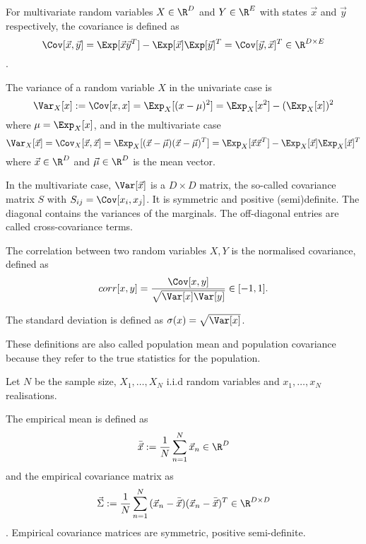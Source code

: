 For multivariate random variables
$X \in \R^D$ and $Y \in \R^E$
with states $\vec{x}$ and $\vec{y}$ respectively,
the covariance is defined as
\begin{equation*}
    \Cov[\vec{x}, \vec{y}]
    = \Exp[\vec{x}\vec{y}^T] - \Exp[\vec{x}]\Exp[\vec{y}]^T
    = \Cov[\vec{y}, \vec{x}]^T
    \in \R^{D \times E}
\end{equation*}.

The variance of a random variable $X$ in the univariate case is
\begin{equation*}
    \Var_X[x] := \Cov[x, x] = \Exp_X[(x - \mu)^2]
    = \Exp_X[x^2] - (\Exp_X[x])^2
\end{equation*}
where $\mu = \Exp_X[x]$,
and in the multivariate case
\begin{equation*}
    \Var_X[\vec{x}] = \Cov_X[\vec{x}, \vec{x}]
    = \Exp_X[(\vec{x} - \vec{\mu })(\vec{x} - \vec{\mu })^T]
    = \Exp_X[\vec{x}\vec{x}^T] - \Exp_X[\vec{x}]\Exp_X[\vec{x}]^T
\end{equation*}
where $\vec{x} \in \R^D$ and $\vec{\mu} \in \R^D$
is the mean vector.

In the multivariate case, $\Var[\vec{x}]$ is a $D \times D$ matrix,
the so-called covariance matrix $S$ with
$S_{ij} = \Cov[x_i, x_j]$.
It is symmetric and positive (semi)definite.
The diagonal contains the variances of the marginals.
The off-diagonal entries are called cross-covariance terms.

The correlation between two random variables $X, Y$ is the normalised
covariance, defined as
\begin{equation*}
    corr[x, y] = \frac{\Cov[x, y]}{\sqrt{\Var[x]\Var[y]}}
    \in [-1, 1].
\end{equation*}

The standard deviation is defined as
$\sigma(x) = \sqrt{\Var[x]}$.

These definitions are also called population mean and population
covariance because they refer to the true statistics for the population.

Let $N$ be the sample size, $X_1, \dotsc, X_N$ i.i.d random variables
and $x_1, \dotsc, x_N$ realisations.

The empirical mean is defined as
\begin{equation*}
    \bar{\vec{x}} := \frac{1}{N}\sum_{n = 1}^N{\vec{x}_n}
    \in \R^D
\end{equation*}
and the empirical covariance matrix as
\begin{equation*}
    \vec{\Sigma} :=
    \frac{1}{N} \sum_{n = 1}^N{
        (\vec{x}_n - \bar{\vec{x}})(\vec{x}_n - \bar{\vec{x}})^T
    }
    \in \R^{D \times D}
\end{equation*}.
Empirical covariance matrices are symmetric, positive semi-definite.

